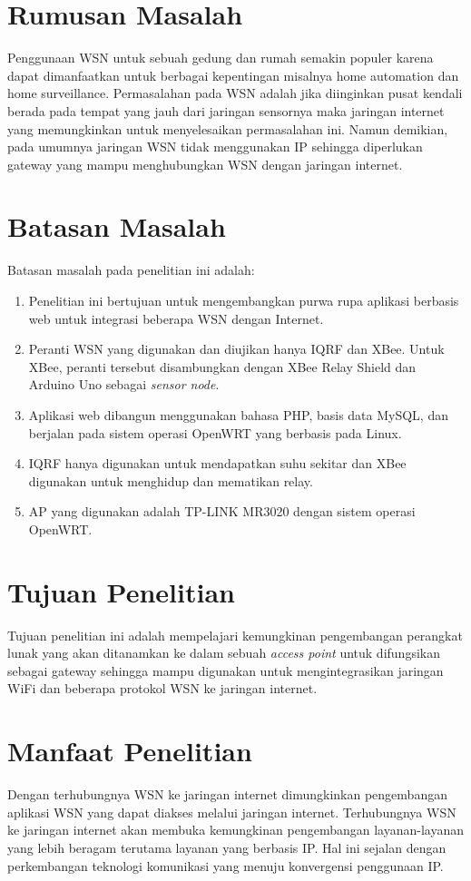 \section{Rumusan Masalah}
Penggunaan WSN untuk sebuah gedung dan rumah semakin populer karena dapat dimanfaatkan untuk berbagai kepentingan misalnya home automation dan home surveillance. Permasalahan pada WSN adalah jika diinginkan pusat kendali berada pada tempat yang jauh dari jaringan sensornya maka jaringan internet yang memungkinkan untuk menyelesaikan permasalahan ini. Namun demikian, pada umumnya jaringan WSN tidak menggunakan IP sehingga diperlukan gateway yang mampu menghubungkan WSN dengan jaringan internet.


\section{Batasan Masalah}
Batasan masalah pada penelitian ini adalah:
\begin{enumerate}
\item Penelitian ini bertujuan untuk mengembangkan purwa rupa aplikasi berbasis web untuk integrasi beberapa WSN dengan Internet.
\item Peranti WSN yang digunakan dan diujikan hanya IQRF dan XBee. Untuk XBee, peranti tersebut disambungkan dengan XBee Relay Shield dan Arduino Uno sebagai \emph{sensor node}.
\item Aplikasi web dibangun menggunakan bahasa PHP, basis data MySQL, dan berjalan pada sistem operasi OpenWRT yang berbasis pada Linux.
\item IQRF hanya digunakan untuk mendapatkan suhu sekitar dan XBee digunakan untuk menghidup dan mematikan relay.
\item AP yang digunakan adalah TP-LINK MR3020 dengan sistem operasi OpenWRT.
\end{enumerate}


\section{Tujuan Penelitian}
Tujuan penelitian ini adalah mempelajari kemungkinan pengembangan perangkat lunak yang akan ditanamkan ke dalam sebuah \emph{access point} untuk difungsikan sebagai gateway sehingga mampu digunakan untuk mengintegrasikan jaringan WiFi dan beberapa protokol WSN ke jaringan internet.


\section{Manfaat Penelitian}
Dengan terhubungnya WSN ke jaringan internet dimungkinkan pengembangan aplikasi WSN yang dapat diakses melalui jaringan internet. Terhubungnya WSN ke jaringan internet akan membuka kemungkinan pengembangan layanan-layanan yang lebih beragam terutama layanan yang berbasis IP. Hal ini sejalan dengan perkembangan teknologi komunikasi yang menuju konvergensi penggunaan IP.

